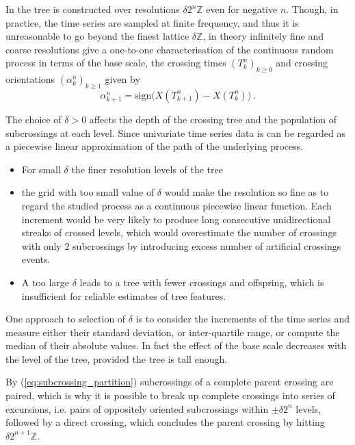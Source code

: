 \documentclass[a4paper]{article}
\begin{document}
In \cite{decrouez2013,ECP1673} the tree is constructed over resolutions $\delta 2^n \mathbb{Z}$
even for negative $n$. Though, in practice, the time series are sampled at finite
frequency, and thus it is unreasonable to go beyond the finest lattice $\delta \mathbb{Z}$,
in theory infinitely fine and coarse resolutions give a one-to-one characterisation
of the continuous random process in terms of the base scale, the crossing times
$(T_k^n)_{k\geq 0}$ and crossing orientations $(\alpha_k^n)_{k\geq 1}$ given by
\begin{equation*} \label{eq:xing_orientations}
    \alpha_{k+1}^n = \text{sign}\bigl( X(T_{k+1}^n) - X(T_k^n) \bigr) \,.
\end{equation*}






The choice of $\delta > 0$ affects the depth of the crossing tree and the population
of subcrossings at each level. Since univariate time series data is can be regarded as a piecewise linear approximation of the path of the underlying process.
\begin{itemize}
    \item For small $\delta$ the finer resolution levels of the tree 

    \item the grid with too small value of $\delta$ would make the resolution so
    fine as to regard the studied process as a continuous piecewise linear function.
    Each increment would be very likely to produce long consecutive unidirectional
    streaks of crossed levels, which would overestimate the number of crossings
    with only 2 subcrossings by introducing excess number of artificial crossings
    events.
    \item A too large $\delta$ leads to a tree with fewer crossings and offspring,
    which is insufficient for reliable estimates of tree features.
\end{itemize}
One approach to selection of $\delta$ is to consider the increments of the time
series and measure either their standard deviation, or inter-quartile range, or
compute the median of their absolute values. In fact the effect of the base scale
decreases with the level of the tree, provided the tree is tall enough.


By (\ref{eq:subcrossing_partition}) subcrossings of a complete parent crossing are
paired, which is why it is possible to break up complete crossings into series of
excursions, i.e. pairs of oppositely oriented subcrossings within $\pm\delta 2^n$
levels, followed by a direct crossing, which concludes the parent crossing by hitting
$\delta 2^{n+1} \mathbb{Z}$.
\end{document}
